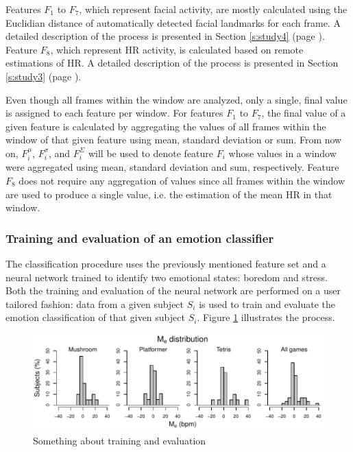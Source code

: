 Features $F_1$ to $F_7$, which represent facial activity, are mostly calculated using the Euclidian distance of automatically detected facial landmarks for each frame. A detailed description of the process is presented in Section \ref{s:study4} (page \pageref{s:study4}). Feature $F_8$, which represent HR activity, is calculated based on remote estimations of HR. A detailed description of the process is presented in Section \ref{s:study3} (page \pageref{s:study3}).

Even though all frames within the window are analyzed, only a single, final value is assigned to each feature per window. For features $F_1$ to $F_7$, the final value of a given feature is calculated by aggregating the values of all frames within the window of that given feature using mean, standard deviation or sum. From now on, $F_i^\mu$, $F_i^\sigma$, and $F_i^\Sigma$ will be used to denote feature $F_i$ whose values in a window were aggregated using mean, standard deviation and sum, respectively. Feature $F_8$ does not require any aggregation of values since all frames within the window are used to produce a single value, i.e. the estimation of the mean HR in that window.

\subsubsection{Training and evaluation of an emotion classifier}
\label{s:experiment1-study5-training-evaluation}

The classification procedure uses the previously mentioned feature set and a neural network trained to identify two emotional states: boredom and stress. Both the training and evaluation of the neural network are performed on a user tailored fashion: data from a given subject $S_i$ is used to train and evaluate the emotion classification of that given subject $S_i$. Figure \ref{fig:study5-training-evaluation} illustrates the process.

\begin{figure}[ht]
\centering
\includegraphics[width=1.0\textwidth]{figures/hist-me.pdf}
\caption{Something about training and evaluation}
\label{fig:study5-training-evaluation}
\end{figure}

